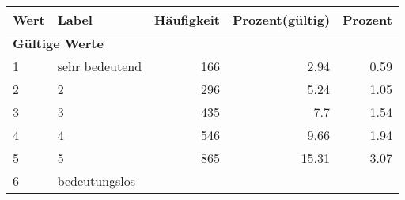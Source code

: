      \begin{longtable}{lXrrr}
     \toprule
     \textbf{Wert} & \textbf{Label} & \textbf{Häufigkeit} & \textbf{Prozent(gültig)} & \textbf{Prozent} \\
     \endhead
     \midrule
     \multicolumn{5}{l}{\textbf{Gültige Werte}}\\

     1 &
     \multicolumn{1}{X}{ sehr bedeutend   } &


       \num{166} &
       \num[round-mode=places,round-precision=2]{2.94} &
         \num[round-mode=places,round-precision=2]{0.59} \\

     2 &
     \multicolumn{1}{X}{ 2   } &


       \num{296} &
       \num[round-mode=places,round-precision=2]{5.24} &
         \num[round-mode=places,round-precision=2]{1.05} \\

     3 &
     \multicolumn{1}{X}{ 3   } &


       \num{435} &
       \num[round-mode=places,round-precision=2]{7.7} &
         \num[round-mode=places,round-precision=2]{1.54} \\

     4 &
     \multicolumn{1}{X}{ 4   } &


       \num{546} &
       \num[round-mode=places,round-precision=2]{9.66} &
         \num[round-mode=places,round-precision=2]{1.94} \\

     5 &
     \multicolumn{1}{X}{ 5   } &


       \num{865} &
       \num[round-mode=places,round-precision=2]{15.31} &
         \num[round-mode=places,round-precision=2]{3.07} \\

     6 &
     \multicolumn{1}{X}{ bedeutungslos   } &



\end{longtable}
